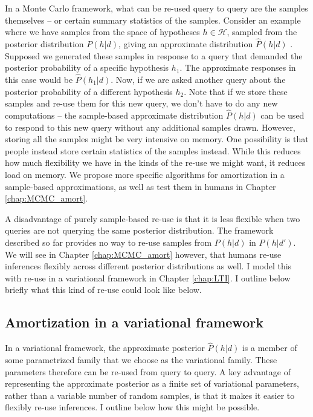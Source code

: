In a Monte Carlo framework, what can be re-used query to query are the samples themselves -- or certain summary statistics of the samples. Consider an example where we have samples from the space of hypotheses $h \in \mathcal{H}$, sampled from the posterior distribution $P(h | d)$, giving an approximate distribution $\hat{P}(h | d)$ . Supposed we generated these samples in response to a query that demanded the posterior probability of a specific hypothesis $h_1$. The approximate responses in this case would be $\hat{P}(h_1 |d)$. Now, if we are asked another query about the posterior probability of a different hypothesis $h_2$. Note that if we store these samples and re-use them for this new query, we don't have to do any new computations -- the sample-based approximate distribution $\hat{P}(h | d)$ can be used to respond to this new query without any additional samples drawn. However, storing all the samples might be very intensive on memory. One possibility is that people instead store certain statistics of the samples instead. While this reduces how much flexibility we have in the kinds of the re-use we might want, it reduces load on memory. We propose more specific algorithms for amortization in a sample-based approximations, as well as test them in humans in Chapter \ref{chap:MCMC_amort}.

A disadvantage of purely sample-based re-use is that it is less flexible when two queries are not querying the same posterior distribution. The framework described so far provides no way to re-use samples from $P(h | d)$ in $P(h | d')$. We will see in Chapter \ref{chap:MCMC_amort} however, that humans re-use inferences flexibly across different posterior distributions as well. I model this with re-use in a variational framework in Chapter \ref{chap:LTI}. I outline below briefly what this kind of re-use could look like below.

\subsection*{Amortization in a variational framework} 

In a variational framework, the approximate posterior $\hat{P}(h | d)$ is a member of some parametrized family that we choose as the variational family. These parameters therefore can be re-used from query to query. A key advantage of representing the approximate posterior as a finite set of variational parameters, rather than a variable number of random samples, is that it makes it easier to flexibly re-use inferences. I outline below how this might be possible.

